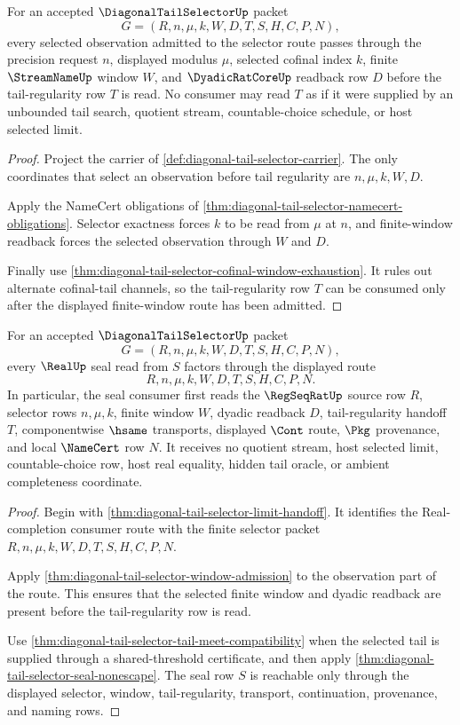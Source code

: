 \begin{theorem}
\label{thm:diagonal-tail-selector-window-admission}
For an accepted $\DiagonalTailSelectorUp$ packet
$$
G=(R,n,\mu,k,W,D,T,S,H,C,P,N),
$$
every selected observation admitted to the selector route passes through the
precision request $n$, displayed modulus $\mu$, selected cofinal index $k$,
finite $\StreamNameUp$ window $W$, and $\DyadicRatCoreUp$ readback row $D$
before the tail-regularity row $T$ is read. No consumer may read $T$ as if it
were supplied by an unbounded tail search, quotient stream, countable-choice
schedule, or host selected limit.
\end{theorem}
\begin{proof}
Project the carrier of \autoref{def:diagonal-tail-selector-carrier}. The only
coordinates that select an observation before tail regularity are
$n,\mu,k,W,D$.

Apply the NameCert obligations of
\autoref{thm:diagonal-tail-selector-namecert-obligations}. Selector exactness
forces $k$ to be read from $\mu$ at $n$, and finite-window readback forces the
selected observation through $W$ and $D$.

Finally use \autoref{thm:diagonal-tail-selector-cofinal-window-exhaustion}.
It rules out alternate cofinal-tail channels, so the tail-regularity row $T$
can be consumed only after the displayed finite-window route has been
admitted.
\end{proof}

\begin{theorem}
\label{thm:diagonal-tail-selector-real-seal-factorization}
For an accepted $\DiagonalTailSelectorUp$ packet
$$
G=(R,n,\mu,k,W,D,T,S,H,C,P,N),
$$
every $\RealUp$ seal read from $S$ factors through the displayed route
$$
R,n,\mu,k,W,D,T,S,H,C,P,N.
$$
In particular, the seal consumer first reads the $\RegSeqRatUp$ source row
$R$, selector rows $n,\mu,k$, finite window $W$, dyadic readback $D$,
tail-regularity handoff $T$, componentwise $\hsame$ transports, displayed
$\Cont$ route, $\Pkg$ provenance, and local $\NameCert$ row $N$. It receives
no quotient stream, host selected limit, countable-choice row, host real
equality, hidden tail oracle, or ambient completeness coordinate.
\end{theorem}
\begin{proof}
Begin with \autoref{thm:diagonal-tail-selector-limit-handoff}. It identifies
the Real-completion consumer route with the finite selector packet
$R,n,\mu,k,W,D,T,S,H,C,P,N$.

Apply \autoref{thm:diagonal-tail-selector-window-admission} to the observation
part of the route. This ensures that the selected finite window and dyadic
readback are present before the tail-regularity row is read.

Use \autoref{thm:diagonal-tail-selector-tail-meet-compatibility} when the
selected tail is supplied through a shared-threshold certificate, and then
apply \autoref{thm:diagonal-tail-selector-seal-nonescape}. The seal row $S$
is reachable only through the displayed selector, window, tail-regularity,
transport, continuation, provenance, and naming rows.
\end{proof}

